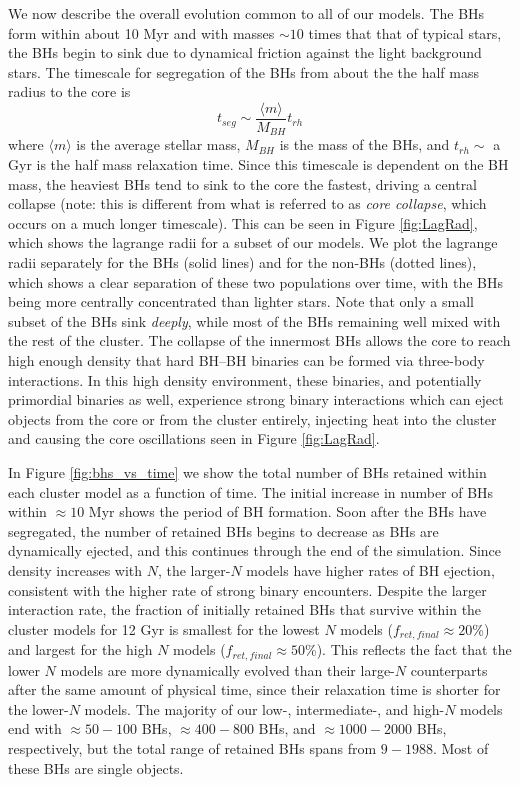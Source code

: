 \documentclass[12pt,preprint]{aastex}
\begin{document}
We now describe the overall evolution common to all of our models. The BHs form
within about 10 Myr and with masses $\sim 10$ times that that of typical stars, 
the BHs begin to sink due to dynamical friction against the light background stars. 
The timescale for segregation of the BHs from about the the half mass radius to the core is 
\begin{equation}
t_{seg} \sim \frac{\langle m \rangle}{M_{BH}} t_{rh}
\label{eq:segregation timescale}
\end{equation}
where $\langle m \rangle$ is the average stellar mass, $M_{BH}$ is the mass of the BHs, 
and $t_{rh} \sim$ a Gyr is the half mass relaxation time. Since this timescale is dependent
on the BH mass, the heaviest BHs tend to sink to the core the fastest, driving a central collapse
(note: this is different from what is referred to as \emph{core collapse}, which occurs on a much longer
timescale). This can be seen in Figure \ref{fig:LagRad}, which shows the lagrange radii
for a subset of our models. We plot the lagrange radii separately for the BHs (solid lines) 
and for the non-BHs (dotted lines), which shows a clear separation of these two populations
over time, with the BHs being more centrally concentrated than lighter stars. 
Note that only a small subset of the BHs sink \emph{deeply}, while most of the 
BHs remaining well mixed with the rest of the cluster. The collapse of the innermost BHs 
allows the core to reach high enough density that hard BH--BH binaries can be formed
via three-body interactions. In this high density environment, these binaries, 
and potentially primordial binaries as well, experience strong binary interactions 
which can eject objects from the core or from the cluster entirely, injecting heat
into the cluster and causing the core oscillations seen in Figure \ref{fig:LagRad}.

In Figure \ref{fig:bhs_vs_time} we show the total number of BHs retained within 
each cluster model as a function of time. The initial increase in number of BHs within
$\approx 10$ Myr shows the period of BH formation. Soon after the BHs have segregated,
the number of retained BHs begins to decrease as BHs are dynamically ejected, and 
this continues through the end of the simulation. Since density increases with $N$, the 
larger-$N$ models have higher rates of BH ejection, consistent with the higher rate
of strong binary encounters. Despite the larger interaction rate, the fraction of initially 
retained BHs that survive within the cluster models for 12 Gyr is smallest for the lowest $N$
models ($f_{ret,final} \approx 20$\%) and largest for the high $N$ models ($f_{ret,final}
\approx 50$\%). This reflects the fact that the lower $N$ models are more dynamically 
evolved than their large-$N$ counterparts after the same amount of physical time, since
their relaxation time is shorter for the lower-$N$ models. 
The majority of our low-, intermediate-, and high-$N$ models end with $\approx 50-100$ BHs,
$\approx 400-800$ BHs, and $\approx 1000-2000$ BHs, respectively, but the total range of
retained BHs spans from $9-1988$. Most of these BHs are single objects.
\end{document}
